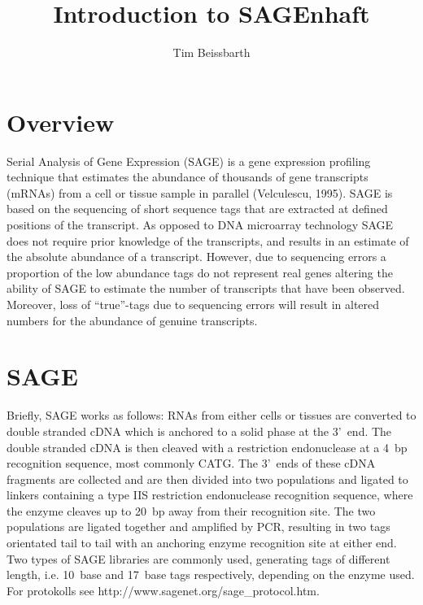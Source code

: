\documentclass[12pt]{article}
\begin{document}
\author{Tim Beissbarth}

\title{Introduction to SAGEnhaft}

\maketitle

\section{Overview}

Serial Analysis of Gene Expression (SAGE) is a gene expression profiling
technique that estimates the abundance of thousands of gene transcripts (mRNAs)
from a cell or tissue sample in parallel (Velculescu, 1995). SAGE is based on
the sequencing of short sequence tags that are extracted at defined positions of
the transcript. As opposed to DNA microarray technology SAGE does not require
prior knowledge of the transcripts, and results in an estimate of the absolute
abundance of a transcript. However, due to sequencing errors a proportion of the
low abundance tags do not represent real genes altering the ability of SAGE to
estimate the number of transcripts that have been observed. Moreover, loss of
``true''-tags due to sequencing errors will result in altered numbers for the
abundance of genuine transcripts.

\section{SAGE}

Briefly, SAGE works as follows: RNAs from either cells or tissues are converted
to double stranded cDNA which is anchored to a solid phase at the 3'~end. The
double stranded cDNA is then cleaved with a restriction endonuclease at a 4~bp
recognition sequence, most commonly CATG. The 3'~ends of these cDNA fragments
are collected and are then divided into two populations and ligated to linkers
containing a type IIS restriction endonuclease recognition sequence, where the
enzyme cleaves up to 20~bp away from their recognition site. The two populations
are ligated together and amplified by PCR, resulting in two tags orientated tail
to tail with an anchoring enzyme recognition site at either end. Two types of
SAGE libraries are commonly used, generating tags of different length,
i.e. 10~base and 17~base tags respectively, depending on the enzyme used. For
protokolls see http://www.sagenet.org/sage\_protocol.htm.
\end{document}
